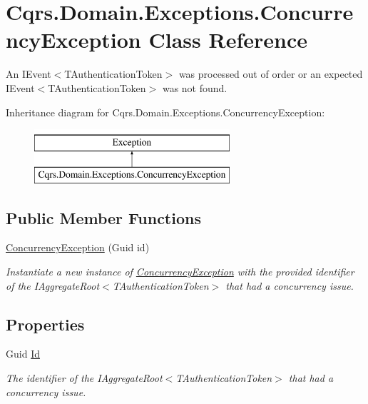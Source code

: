 \hypertarget{classCqrs_1_1Domain_1_1Exceptions_1_1ConcurrencyException}{}\section{Cqrs.\+Domain.\+Exceptions.\+Concurrency\+Exception Class Reference}
\label{classCqrs_1_1Domain_1_1Exceptions_1_1ConcurrencyException}


An I\+Event$<$\+T\+Authentication\+Token$>$ was processed out of order or an expected I\+Event$<$\+T\+Authentication\+Token$>$ was not found.  


Inheritance diagram for Cqrs.\+Domain.\+Exceptions.\+Concurrency\+Exception\+:\begin{figure}[H]
\begin{center}
\leavevmode
\includegraphics[height=2.000000cm]{classCqrs_1_1Domain_1_1Exceptions_1_1ConcurrencyException}
\end{center}
\end{figure}
\subsection*{Public Member Functions}
\begin{DoxyCompactItemize}
\item 
\hyperlink{classCqrs_1_1Domain_1_1Exceptions_1_1ConcurrencyException_aed52d2484adb911db51fd50f18f3e477_aed52d2484adb911db51fd50f18f3e477}{Concurrency\+Exception} (Guid id)
\begin{DoxyCompactList}\small\item\em Instantiate a new instance of \hyperlink{classCqrs_1_1Domain_1_1Exceptions_1_1ConcurrencyException}{Concurrency\+Exception} with the provided identifier of the I\+Aggregate\+Root$<$\+T\+Authentication\+Token$>$ that had a concurrency issue. \end{DoxyCompactList}\end{DoxyCompactItemize}
\subsection*{Properties}
\begin{DoxyCompactItemize}
\item 
Guid \hyperlink{classCqrs_1_1Domain_1_1Exceptions_1_1ConcurrencyException_a7b8143f3a8047307373503c31e8b3366_a7b8143f3a8047307373503c31e8b3366}{Id}
\begin{DoxyCompactList}\small\item\em The identifier of the I\+Aggregate\+Root$<$\+T\+Authentication\+Token$>$ that had a concurrency issue. \end{DoxyCompactList}\end{DoxyCompactItemize}


